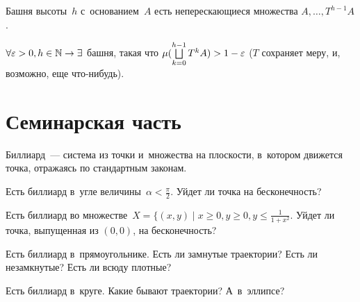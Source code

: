 \documentclass{article}
\begin{document}
\begin{definition}
	Башня высоты~$h$ с~основанием~$A$ есть неперескающиеся множества
	$A, \ldots, T^{h-1}A$.
\end{definition}

\begin{exercise}
	$\forall \varepsilon > 0, h \in \mathbb{N} \rightarrow \exists$ башня, такая что
	$\mu(\bigsqcup\limits_{k=0}^{h-1} T^kA) > 1 - \varepsilon$ ($T$ сохраняет меру, и,
	возможно, еще что-нибудь).
\end{exercise}

\section{Семинарская часть}

\begin{definition}
	Биллиард~--- система из точки и~множества на плоскости, в~котором движется
	точка, отражаясь по стандартным законам.
\end{definition}

\begin{exercise}
	Есть биллиард в~угле величины~$\alpha < \frac{\pi}{2}$. Уйдет ли точка на
	бесконечность?
\end{exercise}
\begin{exercise}
	Есть биллиард во множестве~$X = \{(x, y) \mid x \ge 0, y \ge 0, y \le
	\frac{1}{1 + x^2}$. Уйдет ли точка, выпущенная из $(0, 0)$, на бесконечность?
\end{exercise}
\begin{exercise}
	Есть биллиард в~прямоугольнике. Есть ли замнутые траектории? Есть ли
	незамкнутые? Есть ли всюду плотные?
\end{exercise}
\begin{exercise}
	Есть биллиард в~круге. Какие бывают траектории? А~в~эллипсе?
\end{exercise}
\end{document}
